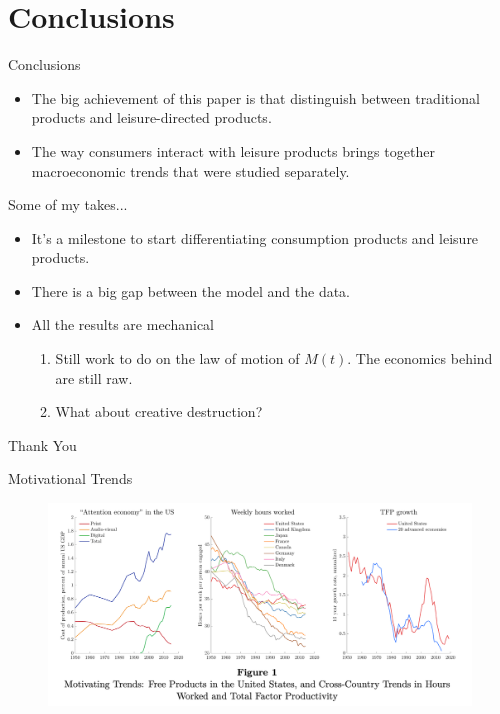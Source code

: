\documentclass[usenames,dvipsnames,aspectratio=169]{beamer}
\begin{document}
\section{Conclusions}

\begin{frame}{Conclusions}

\begin{itemize}
    \item The big achievement of this paper is that distinguish between traditional products and leisure-directed products. 
    \item The way consumers interact with leisure products brings together macroeconomic trends that were studied separately. 
\end{itemize}    
\pause 
Some of my takes... 
\begin{itemize}
    \item It's a milestone to start differentiating consumption products and leisure products. 
    \item There is a big gap between the model and the data. 
    \item All the results are mechanical
    \begin{enumerate}
        \item Still work to do on the law of motion of $M(t)$. The economics behind are still raw. 
        \item What about creative destruction? 
    \end{enumerate}
\end{itemize}
\end{frame}

\begin{frame}
\begin{center}    
    \Huge{Thank You}
\end{center}
\end{frame}



\begin{frame}{Motivational Trends}\label{p1:Mot}
    \begin{figure}
    \centering    
    \includegraphics[width=\textwidth]{Presentation01/Figures/MotFacts.png}
\end{figure}
\hyperlink{p1:Int}{}

\end{frame}
\end{document}
